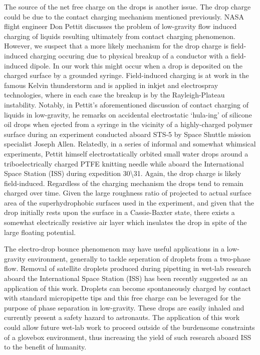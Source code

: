 \documentclass[aip,reprint, floatfix]{revtex4-1}
\begin{document}
The source of the net free charge on the drops is another issue. The drop charge could be due to the contact charging mechanism mentioned previously. NASA flight engineer Don Pettit discusses the problem of low-gravity flow induced charging of liquids resulting ultimately from contact charging phenomenon. \cite{pettit_donald_flow_1996} However, we suspect that a more likely mechanism for the drop charge is field-induced charging occuring due to physical breakup of a conductor with a field-induced dipole. In our work this might occur when a drop is deposited on the charged surface by a grounded syringe. Field-induced charging is at work in the famous Kelvin thunderstorm and is applied in inkjet and electrospray technologies, where in each case the breakup is by the Rayleigh-Plateau instability. Notably, in Pettit's aforementioned discussion of contact charging of liquids in low-gravity, he remarks on accidental electrostatic `hula-ing' of silicone oil drops when ejected from a syringe in the vicinity of a highly-charged polymer surface during an experiment conducted aboard STS-5 by Space Shuttle mission specialist Joseph Allen. \cite{pettit_donald_flow_1996} Relatedly, in a series of informal and somewhat whimsical experiments, Pettit himself electrostatically orbited small water drops around a triboelectrically charged PTFE knitting needle while aboard the International Space Station (ISS) during expedition 30\textbackslash 31. \cite{stevenson_electrostatic_2015} Again, the drop charge is likely field-induced. Regardless of the charging mechanism the drops tend to remain charged over time. Given the large roughness ratio of projected to actual surface area of the superhydrophobic surfaces used in the experiment, and given that the drop initially rests upon the surface in a Cassie-Baxter state, there exists a somewhat electrically resistive air layer which insulates the drop in spite of the large floating potential.

The electro-drop bounce phenomenon may have useful applications in a low-gravity environment, generally to tackle seperation of droplets from a two-phase flow. Removal of satellite droplets produced during pipetting in wet-lab research aboard the International Space Station (ISS) has been recently suggested as an application of this work. \cite{turner_mitigation_2019} Droplets can become spontaneously charged by contact with standard micropipette tips \citep{choi_spontaneous_2013} and this free charge can be leveraged for the purpose of phase separation in low-gravity. These drops are easily inhaled and currently present a safety hazard to astronauts. The application of this work could allow future wet-lab work to proceed outside of the burdensome constraints of a glovebox environment, thus increasing the yield of such research aboard ISS to the benefit of humanity.
\end{document}
